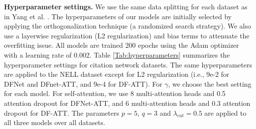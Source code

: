 \documentclass{article}
\begin{document}
\begin{table}[ht]
\centering {}
\caption{Hyperparameter settings for citation network datasets.\label{Tab:hyperparameters}}
\end{table}\vspace{-0.3cm}


\textbf{Hyperparameter settings.} We use the same data splitting for each dataset as in Yang et al. \cite{yang2016revisiting}. The hyperparameters of our models are initially selected by applying the orthogonalization technique (a randomized search strategy). We also use a layerwise regularization (L2 regularization) and bias terms to attenuate the overfitting issue. All models are trained 200 epochs using the Adam optimizer \cite{kingma2014adam} with a learning rate of 0.002. Table \ref{Tab:hyperparameters} summarizes the hyperparameter settings for citation network datasets.  The same hyperparameters are applied to the NELL dataset except for L2 regularization (i.e., 9e-2 for DFNet and DFnet-ATT, and 9e-4 for DF-ATT). For $\gamma$, we choose the best setting for each model. For self-attention, we use 8 multi-attention heads and 0.5 attention dropout for DFNet-ATT, and 6 multi-attention heads and 0.3 attention dropout for DF-ATT. The parameters $p=5$, $q=3$ and $\lambda_{cut}=0.5$ are applied to all three models over all datasets.
\end{document}
